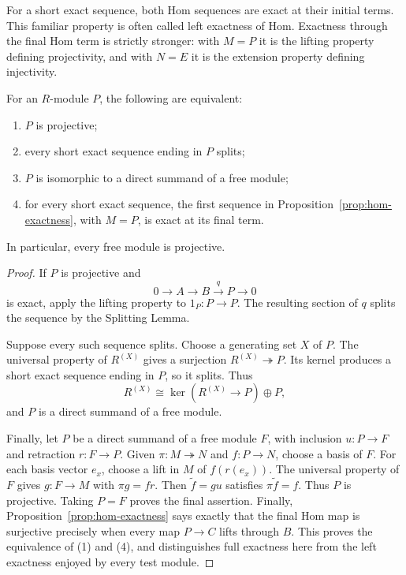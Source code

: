 For a short exact sequence, both Hom sequences are exact at their initial
terms.  This familiar property is often called left exactness of Hom.
Exactness through the final Hom term is strictly stronger: with \(M=P\) it
is the lifting property defining projectivity, and with \(N=E\) it is the
extension property defining injectivity.

\begin{theorem}\label{thm:projective-characterizations}
For an \(R\)-module \(P\), the following are equivalent:
\begin{enumerate}
\item \(P\) is projective;
\item every short exact sequence ending in \(P\) splits;
\item \(P\) is isomorphic to a direct summand of a free module;
\item for every short exact sequence, the first sequence in
Proposition~\ref{prop:hom-exactness}, with \(M=P\), is exact at its final
term.
\end{enumerate}
In particular, every free module is projective.
\end{theorem}
\begin{proof}
If \(P\) is projective and
\[
0\longrightarrow A\longrightarrow B\xrightarrow{q}P\longrightarrow0
\]
is exact, apply the lifting property to \(1_P:P\to P\).  The resulting
section of \(q\) splits the sequence by the Splitting Lemma.

Suppose every such sequence splits.  Choose a generating set \(X\) of \(P\).
The universal property of \(R^{(X)}\) gives a surjection
\(R^{(X)}\twoheadrightarrow P\).  Its kernel produces a short exact
sequence ending in \(P\), so it splits.  Thus
\[
R^{(X)}\cong\ker(R^{(X)}\to P)\oplus P,
\]
and \(P\) is a direct summand of a free module.

Finally, let \(P\) be a direct summand of a free module \(F\), with
inclusion \(u:P\to F\) and retraction \(r:F\to P\).  Given
\(\pi:M\twoheadrightarrow N\) and \(f:P\to N\), choose a basis of \(F\).
For each basis vector \(e_x\), choose a lift in \(M\) of
\(f(r(e_x))\).  The universal property of \(F\) gives
\(g:F\to M\) with \(\pi g=fr\).  Then \(\widetilde f=gu\) satisfies
\(\pi\widetilde f=f\).  Thus \(P\) is projective.  Taking \(P=F\) proves
the final assertion.  Finally, Proposition~\ref{prop:hom-exactness} says
exactly that the final Hom map is surjective precisely when every map
\(P\to C\) lifts through \(B\).  This proves the equivalence of (1) and
(4), and distinguishes full exactness here from the left exactness enjoyed
by every test module.
\end{proof}

